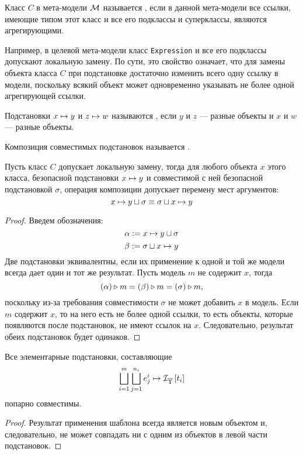 \begin{Def}
Класс $C$ в мета-модели $\mathcal{M}$ называется , если в данной мета-модели все ссылки, имеющие типом этот класс и все его подклассы и суперклассы, являются агрегирующими.
\end{Def}
Например, в целевой мета-модели  класс \texttt{Expression} и все его подклассы допускают локальную замену. По сути, это свойство означает, что для замены объекта класса $C$ при подстановке достаточно изменить всего одну ссылку в модели, поскольку всякий объект может одновременно указывать не более одной агрегирующей ссылки.

\begin{Def}
Подстановки $x \mapsto y$ и $z \mapsto w$ называются , если $y$ и $z$ --- разные объекты и $x$ и $w$ --- разные объекты.

Композиция совместимых подстановок называется .
\end{Def}

\begin{Lemm}
Пусть класс $C$ допускает локальную замену, тогда для любого объекта $x$ этого класса, безопасной подстановки $x \mapsto y$ и совместимой с ней безопасной подстановкой $\sigma$, операция композиции допускает перемену мест аргументов:
$$
	x \mapsto y \sqcup \sigma \equiv \sigma \sqcup x \mapsto y 
$$
\end{Lemm}
\begin{proof}
Введем обозначения:
$$\alpha := x \mapsto y \sqcup \sigma$$
$$\beta := \sigma \sqcup x \mapsto y$$
Две подстановки эквивалентны, если их применение к одной и той же модели всегда дает один и тот же результат. Пусть модель $m$ не содержит $x$, тогда
$$\left( \alpha \right) \triangleright m = \left( \beta \right) \triangleright m = \left( \sigma \right) \triangleright m,$$
поскольку из-за требования совместимости $\sigma$ не может добавить $x$ в модель.
Если $m$ содержит $x$, то на него есть не более одной ссылки, то есть объекты, которые появляются после подстановок, не имеют ссылок на $x$. Следовательно, результат обеих подстановок будет одинаков.
\end{proof}

\begin{Lemm}
Все элементарные подстановки, составляющие 
$$
\bigsqcup\limits_{i=1}^{m} \bigsqcup\limits_{j=1}^{n_i}
			e^i_j \mapsto \mathcal{I}_{\overline{\Upsilon}} \left[ t_i \right]
$$
попарно совместимы.
\end{Lemm}
\begin{proof}
Результат применения шаблона всегда является новым объектом и, следовательно, не может совпадать ни с одним из объектов в левой части подстановок.
\end{proof}

